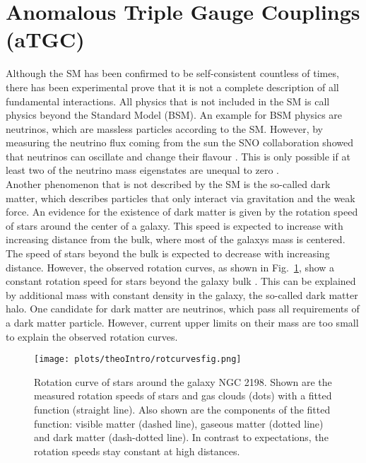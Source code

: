 \section{Anomalous Triple Gauge Couplings (aTGC)}
\label{sec:aTGC}
Although the SM has been confirmed to be self-consistent countless of times, there has been experimental prove that it is not a complete description of all fundamental interactions. All physics that is not included in the SM is call physics beyond the Standard Model (BSM). An example for BSM physics are neutrinos, which are massless particles according to the SM. However, by measuring the neutrino flux coming from the sun the SNO collaboration showed that neutrinos can oscillate and change their flavour \cite{SNO}. This is only possible if at least two of the neutrino mass eigenstates are unequal to zero \cite{}.\\
Another phenomenon that is not described by the SM is the so-called dark matter, which describes particles that only interact via gravitation and the weak force. An evidence for the existence of dark matter is given by the rotation speed of stars around the center of a galaxy. This speed is expected to increase with increasing distance from the bulk, where most of the galaxys mass is centered. The speed of stars beyond the bulk is expected to decrease with increasing distance. However, the observed rotation curves, as shown in Fig.~\ref{fig:theo:rotcurves}, show a constant rotation speed for stars beyond the galaxy bulk \cite{rotcurves}. This can be explained by additional mass with constant density in the galaxy, the so-called dark matter halo. One candidate for dark matter are neutrinos, which pass all requirements of a dark matter particle. However, current upper limits on their mass are too small to explain the observed rotation curves.
\begin{figure}
	\centering
	\texttt{[image: plots/theoIntro/rotcurvesfig.png]}
	\caption[Rotation curve of stars around the galaxy NGC 2198]{Rotation curve of stars around the galaxy NGC 2198. Shown are the measured rotation speeds of stars and gas clouds (dots) with a fitted function (straight line). Also shown are the components of the fitted function: visible matter (dashed line), gaseous matter (dotted line) and dark matter (dash-dotted line). In contrast to expectations, the rotation speeds stay constant at high distances.}
	\label{fig:theo:rotcurves}
\end{figure}

